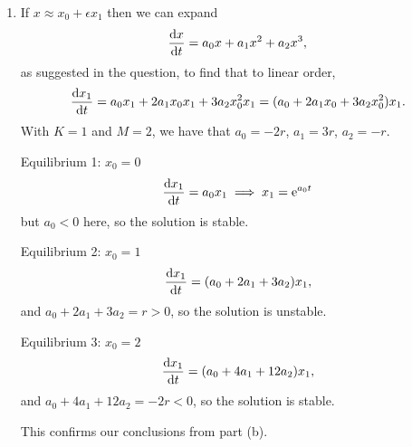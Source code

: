 \documentclass[a4paper, 12pt]{article}
\begin{document}
\begin{enumerate}[label={\bf \arabic{*}.\;}, ref={\arabic{*}},itemsep=3ex, left=0ex]
{\begin{enumerate}[label=(\alph*)]
\begin{enumerate}
            \item We have a singularity when
              \begin{equation}
                1-A\e^{2rt} = 0 \implies A = \frac{1}{\e^{2rt}}.
              \end{equation}
              Given $t>0$, the possible values for $A$ are therefore $0<A<1$.
          \end{enumerate}
        \item If $x\approx x_0 + \epsilon x_1$ then we can expand
          \begin{equation}
            \fd{x}{t} = a_0x + a_1 x^2 + a_2 x^3,
          \end{equation}
          as suggested in the question, to find that to linear order,
          \begin{equation}
            \fd{x_1}{t}= a_0x_1 +2a_1x_0x_1 + 3a_2x_0^2x_1 = (a_0 +2a_1x_0 + 3a_2x_0^2)x_1.
          \end{equation}
          With $K=1$ and $M=2$, we have that $a_0 = -2r$, $a_1 = 3r$, $a_2 = -r$.

          Equilibrium 1: $x_0=0$
          \begin{equation}
            \fd{x_1}{t}=a_0 x_1 \implies x_1 = \e ^{a_0 t}
          \end{equation}
          but $a_0<0$ here, so the solution is stable.

          Equilibrium 2: $x_0=1$
          \begin{equation}
            \fd{x_1}{t}= (a_0 +2a_1 + 3a_2)x_1,
          \end{equation}
          and $a_0 +2a_1 + 3a_2= r>0$, so the solution is unstable.

          Equilibrium 3: $x_0=2$
          \begin{equation}
            \fd{x_1}{t}= (a_0 +4a_1 + 12a_2)x_1,
          \end{equation}
          and $a_0 +4a_1 + 12a_2 = -2r<0$, so the solution is stable.

          This confirms our conclusions from part (b).


\end{enumerate}}
\end{enumerate}
\end{document}

